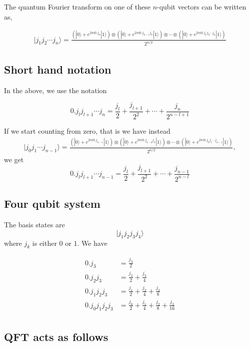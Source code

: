 \documentclass[%
oneside,                 %
final,                   %
10pt]{article}
\begin{document}
The quantum Fourier
transform on one of these \(n\)-qubit vectors can be written as,

\begin{align*}
|j_1j_2 \cdots j_n \rangle = \frac{\left(|0\rangle +e^{2\pi i0.j_n}|1\rangle\right) \otimes \left(|0\rangle +e^{2\pi i0.j_{n-1}j_n}|1\rangle\right) \otimes \cdots \otimes \left(|0\rangle +e^{2\pi i0.j_1j_2 \cdots j_n}|1\rangle\right)}{2^{n/2}}
\end{align*}

\subsection{Short hand notation}

In the above, we use the notation

\[
0.j_lj_{l+1} \cdots j_n = \frac{j_l}{2} + \frac{j_{l+1}}{2^2} + \cdots + \frac{j_n}{2^{n-l+1}}
\]

If we start counting from zero, that is we have instead
\begin{align*}
|j_0j_1 \cdots j_{n-1} \rangle = \frac{\left(|0\rangle +e^{2\pi i0.j_{n-1}}|1\rangle\right) \otimes \left(|0\rangle +e^{2\pi i0.j_{n-2}j_n}|1\rangle\right) \otimes \cdots \otimes \left(|0\rangle +e^{2\pi i0.j_0j_1 \cdots j_{n-1}}|1\rangle\right)}{2^{n/2}},
\end{align*}
we get
\[
0.j_lj_{l+1} \cdots j_{n-1} = \frac{j_l}{2} + \frac{j_{l+1}}{2^2} + \cdots + \frac{j_{n-1}}{2^{n-l}}
\]

\subsection{Four qubit system}
The basis states are
\[
|j_1j_2j_3j_4 \rangle
\]
where \(j_k\) is either \(0\) or \(1\). We have

\begin{align*}
0.j_3 &= \frac{j_3}{2} \\
0.j_2j_3 &= \frac{j_2}{2} + \frac{j_3}{4} \\
0.j_1j_2j_3 &= \frac{j_1}{2} + \frac{j_2}{4} + \frac{j_3}{8} \\
0.j_0j_1j_2j_3 &= \frac{j_0}{2} + \frac{j_1}{4} + \frac{j_2}{8} + \frac{j_3}{16} \\
\end{align*}

\subsection{QFT acts as follows}
\end{document}
